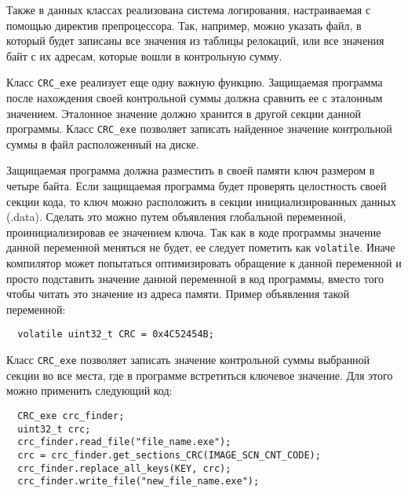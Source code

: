 Также в данных классах реализована система логирования, настраиваемая с помощью
директив препроцессора. Так, например, можно указать файл, в который будет
записаны все значения из таблицы релокаций, или все значения байт с их адресам,
которые вошли в контрольную сумму.

Класс \verb!CRC_exe! реализует еще одну важную функцию. Защищаемая программа
после нахождения своей контрольной суммы должна сравнить ее с эталонным
значением. Эталонное значение должно хранится в другой секции данной программы.
Класс \verb!CRC_exe! позволяет записать найденное значение контрольной суммы в
файл расположенный на диске. 

Защищаемая программа должна разместить в своей памяти ключ размером в четыре
байта. Если защищаемая программа будет проверять целостность своей секции кода,
то ключ можно расположить в секции инициализированных данных (.data). Сделать
это можно путем объявления глобальной переменной, проинициализировав ее
значением ключа. Так как в коде программы значение данной переменной меняться не
будет, ее следует пометить как \verb!volatile!. Иначе компилятор может
попытаться оптимизировать обращение к данной переменной и просто подставить
значение данной переменной в код программы, вместо того чтобы читать это
значение из адреса памяти. Пример объявления такой переменной:
\begin{verbatim}
  volatile uint32_t CRC = 0x4C52454B;
\end{verbatim}

Класс \verb!CRC_exe! позволяет записать значение контрольной суммы выбранной
секции во все места, где в программе встретиться ключевое значение. Для этого
можно применить следующий код:
\begin{verbatim}
  CRC_exe crc_finder;
  uint32_t crc;
  crc_finder.read_file("file_name.exe");
  crc = crc_finder.get_sections_CRC(IMAGE_SCN_CNT_CODE);
  crc_finder.replace_all_keys(KEY, crc);
  crc_finder.write_file("new_file_name.exe");
\end{verbatim}

